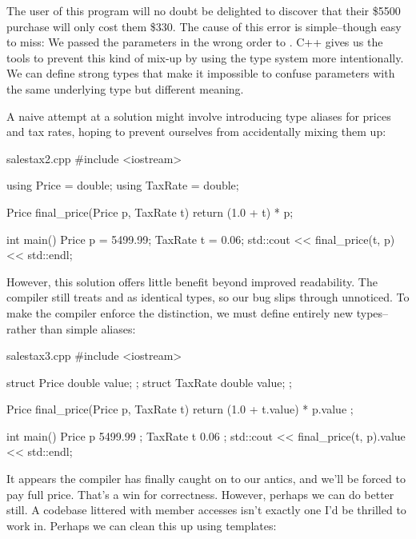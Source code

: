 \documentclass[12pt]{article}
\begin{document}
\noindent
The user of this program will no doubt be delighted to discover that their \$5500 purchase will only cost them \$330.
The cause of this error is simple--though easy to miss:
We passed the parameters in the wrong order to .
C++ gives us the tools to prevent this kind of mix-up by using the type system more intentionally.
We can define strong types that make it impossible to confuse parameters with the same underlying type but different meaning.

\vspace{1em}
\noindent
A naive attempt at a solution might involve introducing type aliases for prices and tax rates, hoping to prevent ourselves from accidentally mixing them up:

\begin{cxx}{salestax2.cpp}
#include <iostream>

using Price = double;
using TaxRate = double;

Price final_price(Price p, TaxRate t)
{
	return (1.0 + t) * p;
}

int main()
{
	Price p = 5499.99;
	TaxRate t = 0.06;
	std::cout << final_price(t, p) << std::endl;
}
\end{cxx}

\noindent
However, this solution offers little benefit beyond improved readability.
The compiler still treats  and  as identical types, so our bug slips through unnoticed.
To make the compiler enforce the distinction, we must define entirely new types--rather than simple aliases:

\begin{cxx}{salestax3.cpp}
#include <iostream>

struct Price { double value; };
struct TaxRate { double value; };

Price final_price(Price p, TaxRate t)
{
	return { (1.0 + t.value) * p.value };
}

int main()
{
	Price p { 5499.99 };
	TaxRate t { 0.06 };
	std::cout << final_price(t, p).value << std::endl;
}
\end{cxx}


\noindent
It appears the compiler has finally caught on to our antics, and we'll be forced to pay full price.
That’s a win for correctness.
However, perhaps we can do better still.
A codebase littered with  member accesses isn’t exactly one I’d be thrilled to work in.
Perhaps we can clean this up using templates:
\end{document}
